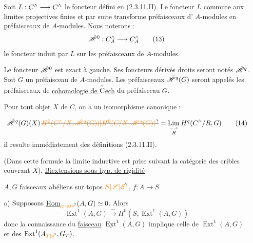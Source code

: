 Soit $L:C^{\wedge}\longrightarrow C^{\wedge}$ le foncteur défini en (2.3.11.II). Le foncteur $L$ commute aux limites projectives finies et par suite transforme  préfaisceaux d' $A$-modules en préfaisceaux de $A$-modules. Nous noterons :
\[
\handwritten{\check{\mathscr H}^{0}}:C_A^{\handwritten{\wedge}}\handwritten{\longrightarrow}C_A^{\handwritten{\wedge}}\tag*{\handwritten{(13)}}
\]
le foncteur induit par $L$ sur les préfaisceaux de $A$-modules.

Le foncteur $\check{\mathscr H}^0$ est exact à  gauche. Ses foncteurs dérivés droits seront notés $\check{\mathscr H}^q$.  Soit $G$ un préfaisceau de $A$-modules. Les préfaisceaux $\check{\mathscr H}^q(G)$ seront appelés les préfaisceaux de \uline{cohomologie de $\overset{\scriptscriptstyle\vee}{\text{C}}$ech} du préfaisceau $G$.

Pour tout objet $X$ de $C$, on a un isomorphisme canonique :


\[
\handwritten{\check{\mathscr H}^q(G)(X)}\,\deleted{\unsure{H^0(C^\wedge/X,\check{\mathscr H}^q(G))|H^0(C/X,\mathscr H^q(G))}}=
\mathop{\underset{\handwritten{\longrightarrow}}{\mathrm{Lim}}}_R H^q(C^{\handwritten{\wedge}}/R,G)\tag*{\handwritten{(14)}}
\]
 il resulte immédiatement des définitions (2.3.11.II).

(Dans cette formule la limite inductive est prise suivant la catégorie des cribles couvrant $X$).
\uline{Biextensions sous hyp. de rigidité}

$A,G$ faisceaux abéliens sur topos $\unsure{S|\mathscr S|\mathcal S}$, $f:A\to S$ 

a) Supposons $\underline{\operatorname{Hom}}_{\unsure{\mathrm{gr}| \mathrm{grs}}}(A,G)\simeq0$. Alors
\[
\operatorname{Ext}^1(A,G)\xrightarrow{\sim}H^0(S,\underline{\operatorname{Ext}}^1(A,G))
\]
donc la connaissance du \uline{faisceau} $\underline{\operatorname{Ext}}^1(A,G)$ implique celle de $\operatorname{Ext}^1(A,G)$ et  des $\operatorname{Ext}^1(A_{\unsure{T|s}},G_T)$.

